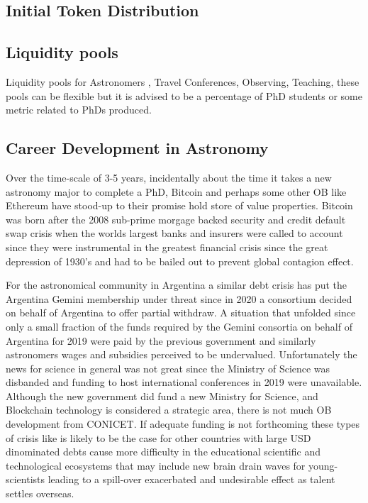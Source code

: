 \documentclass[final,5p,times,twocolumn,authoryear]{elsarticle}
\begin{document}
\subsection{Initial Token Distribution}

\subsection{Liquidity pools}

Liquidity pools for Astronomers , Travel Conferences, Observing, Teaching, these pools can be flexible but it is advised to be a percentage of PhD  students or some metric related to PhDs produced. 

\subsection{Career Development in Astronomy}

Over the time-scale of 3-5 years, incidentally about the time it takes a new astronomy major to complete a PhD, Bitcoin and perhaps some other OB like Ethereum have stood-up to their promise hold store of value properties. Bitcoin was born after the 2008 sub-prime morgage backed security and credit default swap crisis when the worlds largest banks and insurers were called to account since they were instrumental in the greatest financial crisis since the great depression of 1930's and had to be bailed out to prevent global contagion effect.
 
For the astronomical community in Argentina a similar debt crisis has put the Argentina Gemini membership under threat since in 2020 a consortium decided on behalf of Argentina to offer partial withdraw. A situation that unfolded since only a small fraction of the funds required by the Gemini consortia on behalf of Argentina for 2019 were paid by the previous government and similarly astronomers wages and subsidies perceived to be undervalued. Unfortunately the news for science in general was not great since the Ministry of Science was disbanded and funding to host international conferences in 2019 were unavailable. Although the new government did fund a new Ministry for Science, and Blockchain technology is considered a strategic area, there is not much OB development from CONICET. If adequate funding is not forthcoming these types of crisis like is likely to be the case for other countries with large USD dinominated debts cause more difficulty in the educational scientific and technological ecosystems that may include new brain drain waves for young-scientists leading to a spill-over exacerbated and undesirable effect as talent settles overseas. 
\end{document}
